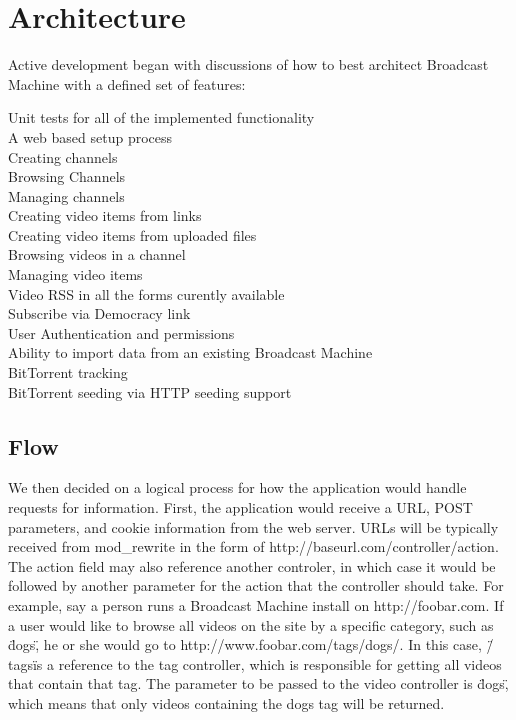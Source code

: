 \documentclass[a4paper,12pt]{report}
\begin{document}
\section{Architecture}
Active development began with discussions of how to best architect Broadcast Machine with a defined set of features:
\begin{description}
\item[Unit tests for all of the implemented functionality]
\item[A web based setup process]
\item[Creating channels]
\item[Browsing Channels]
\item[Managing channels]
\item[Creating video items from links]
\item[Creating video items from uploaded files]
\item[Browsing videos in a channel]
\item[Managing video items]
\item[Video RSS in all the forms curently available]
\item[Subscribe via Democracy link]
\item[User Authentication and permissions]
\item[Ability to import data from an existing Broadcast Machine]
\item[BitTorrent tracking]
\item[BitTorrent seeding via HTTP seeding support]
\end{description}


\subsection{Flow}
We then decided on a logical process for how the application would handle requests for information.
First, the application would receive a URL, POST parameters, and cookie information from the web server.
URLs will be typically received from mod\_rewrite in the form of http://baseurl.com/controller/action.
The action field may also reference another controler, in which case it would be followed by another parameter for the action that the controller should take.
For example, say a person runs a Broadcast Machine install on http://foobar.com.
If a user would like to browse all videos on the site by a specific category, such as \"dogs\", he or she would go to http://www.foobar.com/tags/dogs/.
In this case, \"/tags\" is a reference to the tag controller, which is responsible for getting all videos that contain that tag.
The parameter to be passed to the video controller is \"dogs\", which means that only videos containing the dogs tag will be returned.
\end{document}
